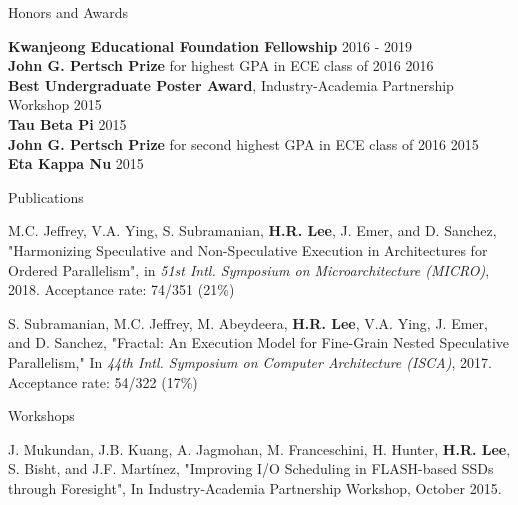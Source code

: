 \documentclass{resume} %
\begin{document}
\newpage


\begin{rSection}{Honors and Awards}

{\bf Kwanjeong Educational Foundation Fellowship} \hfill {2016 - 2019} \\
{\bf John G. Pertsch Prize} for highest GPA in ECE class of 2016 \hfill{2016} \\
{\bf Best Undergraduate Poster Award}, Industry-Academia Partnership Workshop \hfill {2015} \\
{\bf Tau Beta Pi} \hfill {2015} \\
{\bf John G. Pertsch Prize} for second highest GPA in ECE class of 2016 \hfill {2015} \\
{\bf Eta Kappa Nu} \hfill {2015} 

\end{rSection}


\begin{rSection}{Publications}

M.C. Jeffrey, V.A. Ying, S. Subramanian, {\bf H.R. Lee}, J. Emer, and D. Sanchez,
"Harmonizing Speculative and Non-Speculative Execution in Architectures for Ordered Parallelism",
in \textit{51st Intl. Symposium on Microarchitecture (MICRO)}, 2018. Acceptance rate: 74/351 (21\%)

S. Subramanian, M.C. Jeffrey, M. Abeydeera, {\bf H.R. Lee}, V.A. Ying, J. Emer, and D. Sanchez, 
"Fractal: An Execution Model for Fine-Grain Nested Speculative Parallelism,"
In \textit{44th Intl. Symposium on Computer Architecture (ISCA)}, 2017. Acceptance rate: 54/322 (17\%)

\end{rSection}


\begin{rSection}{Workshops}

J. Mukundan, J.B. Kuang, A. Jagmohan, M. Franceschini, H. Hunter, {\bf H.R. Lee}, S. Bisht, and J.F. Martínez, "Improving I/O Scheduling in FLASH-based SSDs through Foresight", In Industry-Academia Partnership Workshop, October 2015.

\end{rSection}
\end{document}

